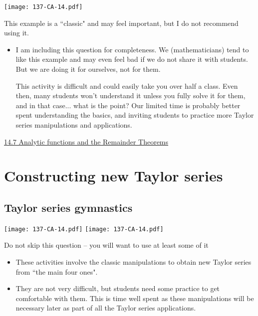 \documentclass[11pt]{article}
\newcommand{\nl}{\hfill \vspace{-1.1\baselineskip}} %
\newcommand{\vvii}{\hspace{8mm}  \href{https://www.youtube.com/watch?v=SXLJOa1_GMs&list=PLlwePzQY_wW9h32ZwS6CYsY4eR_b2pE9j&index=7}{14.7 Analytic functions and the Remainder Theorems}}
\begin{document}
\begin{center}
{ \texttt{[image: 137-CA-14.pdf]}} 
\end{center}

\begin{warning}
	This example is a ``classic" and may feel important, but I do not recommend using it.
\end{warning}


\begin{comments}
\nl
	\begin{itemize}
		\item I am including this question for completeness.  We (mathematicians) tend to like this example and may even feel bad if we do not share it with students.  But we are doing it for ourselves, not for them.
		
		This activity is difficult and could easily take you over half a class.  Even then, many students won't understand it unless you fully solve it for them, and in that case... what is the point?  Our limited time is probably better spent understanding the basics, and inviting students to practice more Taylor series manipulations and applications.
	\end{itemize}
\end{comments}

\begin{videos}
\vvii
\end{videos}

\newpage
\section{Constructing new Taylor series}
\subsection{Taylor series gymnastics}

\begin{center}
{ \texttt{[image: 137-CA-14.pdf]}}  \quad
{ \texttt{[image: 137-CA-14.pdf]}} 
\end{center}

\begin{warning}
Do not skip this question -- you will want to use at least some of it
\end{warning}

\begin{comments}
\nl
	\begin{itemize}
		\item These activities involve the classic manipulations to obtain new Taylor series from ``the main four ones".   
		
		\item They are not very difficult, but students need some practice to get comfortable with them.  This is time well spent as these manipulations will be necessary later as part of all the Taylor series applications.
	\end{itemize}
\end{comments}
\end{document}
